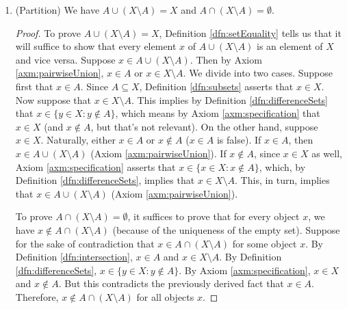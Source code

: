 \documentclass[../main.tex]{subfiles}
\begin{document}
\begin{enumerate}[ref={\thesection.\arabic*}]
\begin{prp}
\begin{enumerate}[label={\textup{(}\alph*\textup{)}},ref={\theenumi\alph*}]
            \item \label{exr:3.1.6g}(Partition) We have $A\cup(X\setminus A)=X$ and $A\cap(X\setminus A)=\emptyset$.
            \begin{proof}
                To prove $A\cup(X\setminus A)=X$, Definition \ref{dfn:setEquality} tells us that it will suffice to show that every element $x$ of $A\cup(X\setminus A)$ is an element of $X$ and vice versa. Suppose $x\in A\cup(X\setminus A)$. Then by Axiom \ref{axm:pairwiseUnion}, $x\in A$ or $x\in X\setminus A$. We divide into two cases. Suppose first that $x\in A$. Since $A\subseteq X$, Definition \ref{dfn:subsets} asserts that $x\in X$. Now suppose that $x\in X\setminus A$. This implies by Definition \ref{dfn:differenceSets} that $x\in\{y\in X:y\notin A\}$, which means by Axiom \ref{axm:specification} that $x\in X$ (and $x\notin A$, but that's not relevant). On the other hand, suppose $x\in X$. Naturally, either $x\in A$ or $x\notin A$ ($x\in A$ is false). If $x\in A$, then $x\in A\cup(X\setminus A)$ (Axiom \ref{axm:pairwiseUnion}). If $x\notin A$, since $x\in X$ as well, Axiom \ref{axm:specification} asserts that $x\in\{x\in X:x\notin A\}$, which, by Definition \ref{dfn:differenceSets}, implies that $x\in X\setminus A$. This, in turn, implies that $x\in A\cup(X\setminus A)$ (Axiom \ref{axm:pairwiseUnion}).\par
                To prove $A\cap(X\setminus A)=\emptyset$, it suffices to prove that for every object $x$, we have $x\notin A\cap(X\setminus A)$ (because of the uniqueness of the empty set). Suppose for the sake of contradiction that $x\in A\cap(X\setminus A)$ for some object $x$. By Definition \ref{dfn:intersection}, $x\in A$ and $x\in X\setminus A$. By Definition \ref{dfn:differenceSets}, $x\in\{y\in X:y\notin A\}$. By Axiom \ref{axm:specification}, $x\in X$ and $x\notin A$. But this contradicts the previously derived fact that $x\in A$. Therefore, $x\notin A\cap(X\setminus A)$ for all objects $x$.

\end{proof}
\end{enumerate}
\end{prp}
\end{enumerate}
\end{document}
